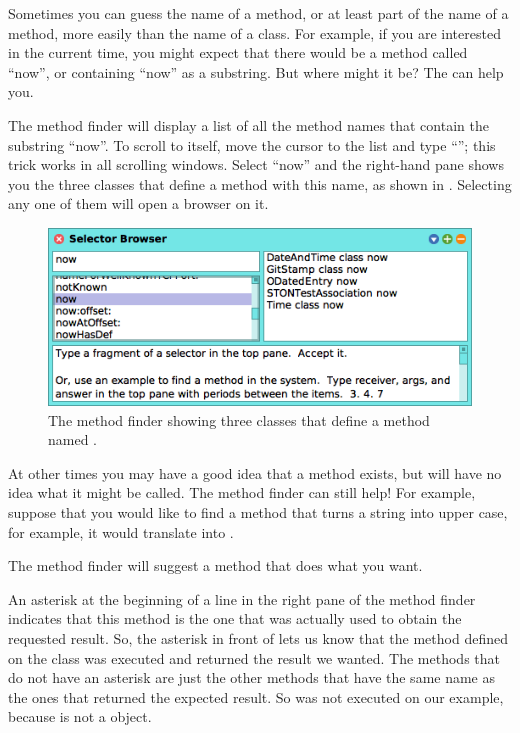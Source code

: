 \documentclass[a4paper,10pt,twoside]{book}
\begin{document}
Sometimes you can guess the name of a method, or at least part of the name of a method, more easily than the name of a class.  For example, if you are interested in the current time, you might expect that there would be a method called ``now'', or containing ``now'' as a substring.   But where might it be?
The  can help you.

The method finder will display a list of all the method names that contain the substring ``now''.  
To scroll to  itself, move the cursor to the list and type ``''; this trick works in all scrolling windows.  Select ``now'' and the right-hand pane shows you the three classes that define a method with this name, as shown in .  Selecting any one of them will open a browser on it.

\begin{figure}[hbt]
\centerline {\includegraphics[scale=0.6]{methodFinder-now}}
\caption{The method finder showing three classes that define a method named .
\label{fig:MethodFinder}}
\end{figure}

At other times you may have a good idea that a method exists, but will have no idea what it might be called.
The method finder can still help!  For example, suppose that you would like to find a method that turns a string into upper case, for example, it would translate  into .

\noindent
The method finder will suggest a method that does what you want.

An asterisk at the beginning of a line in the right pane of the method finder indicates that this method is the one that was actually used to obtain the requested result. 
So, the asterisk in front of  lets us know that the method  defined on the class  was executed and returned the result we wanted. The methods that do not have an asterisk are just the other methods that have the same name as the ones that returned the expected result. So  was not executed on our example, because  is not a  object.
\end{document}
